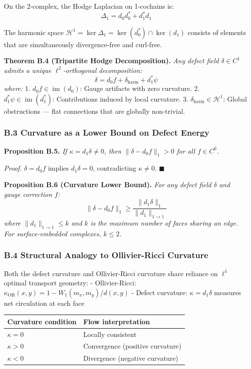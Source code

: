 \documentclass[
]{article}
\begin{document}
On the 2-complex, the Hodge Laplacian on 1-cochains is:
\[ \Delta_1 = d_0 d_0^* + d_1^* d_1 \]

The harmonic space
\(\mathcal{H}^1 = \ker \Delta_1 = \ker(d_0^*) \cap \ker(d_1)\) consists
of elements that are simultaneously divergence-free and curl-free.

\textbf{Theorem B.4 (Tripartite Hodge Decomposition).} \emph{Any defect
field \(\delta \in C^1\) admits a unique \(\ell^2\)-orthogonal
decomposition:} \[ \delta = d_0 f + \delta_{\text{harm}} + d_1^* \psi \]
\emph{where:} 1. \(d_0 f \in \operatorname{im}(d_0)\): Gauge artifacts
with zero curvature. 2. \(d_1^* \psi \in \operatorname{im}(d_1^*)\):
Contributions induced by local curvature. 3.
\(\delta_{\text{harm}} \in \mathcal{H}^1\): Global obstructions --- flat
connections that are globally non-trivial.

\subsubsection{B.3 Curvature as a Lower Bound on Defect
Energy}\label{b.3-curvature-as-a-lower-bound-on-defect-energy}

\textbf{Proposition B.5.} \emph{If \(\kappa = d_1 \delta \neq 0\), then
\(\|\delta - d_0 f\|_1 > 0\) for all \(f \in C^0\).}

\emph{Proof.} \(\delta = d_0 f\) implies \(d_1 \delta = 0\),
contradicting \(\kappa \neq 0\). \(\blacksquare\)

\textbf{Proposition B.6 (Curvature Lower Bound).} \emph{For any defect
field \(\delta\) and gauge correction \(f\):}
\[ \|\delta - d_0 f\|_1 \geq \frac{\|d_1 \delta\|_1}{\|d_1\|_{1 \to 1}} \]
\emph{where \(\|d_1\|_{1 \to 1} \leq k\) and \(k\) is the maximum number
of faces sharing an edge. For surface-embedded complexes, \(k \leq 2\).}

\subsubsection{B.4 Structural Analogy to Ollivier-Ricci
Curvature}\label{b.4-structural-analogy-to-ollivier-ricci-curvature}

Both the defect curvature and Ollivier-Ricci curvature share reliance on
\(\ell^1\) optimal transport geometry: - Ollivier-Ricci:
\(\kappa_{\text{OR}}(x, y) = 1 - W_1(m_x, m_y)/d(x, y)\) - Defect
curvature: \(\kappa = d_1 \delta\) measures net circulation at each face

\begin{longtable}[]{@{}ll@{}}
\toprule\noalign{}
Curvature condition & Flow interpretation \\
\midrule\noalign{}
\endhead
\bottomrule\noalign{}
\endlastfoot
\(\kappa = 0\) & Locally consistent \\
\(\kappa > 0\) & Convergence (positive curvature) \\
\(\kappa < 0\) & Divergence (negative curvature) \\
\end{longtable}
\end{document}
